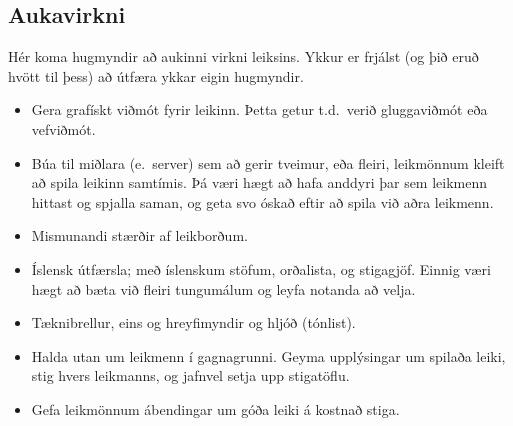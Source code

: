\documentclass[12pt,a4paper]{article}
\begin{document}
\subsection*{Aukavirkni}

Hér koma hugmyndir að aukinni virkni leiksins. Ykkur er frjálst (og þið eruð hvött til þess) að útfæra ykkar eigin hugmyndir.

\begin{itemize}

	\item Gera grafískt viðmót fyrir leikinn. Þetta getur t.d.~verið gluggaviðmót eða vefviðmót.

	\item Búa til miðlara (e.~server) sem að gerir tveimur, eða fleiri, leikmönnum kleift að spila leikinn samtímis.  Þá væri hægt að hafa anddyri þar sem leikmenn hittast og spjalla saman, og geta svo óskað eftir að spila við aðra leikmenn.

	\item Mismunandi stærðir af leikborðum.

	\item Íslensk útfærsla; með íslenskum stöfum, orðalista, og stigagjöf. Einnig væri hægt að bæta við fleiri tungumálum og leyfa notanda að velja.

	\item Tæknibrellur, eins og hreyfimyndir og hljóð (tónlist).

	\item Halda utan um leikmenn í gagnagrunni. Geyma upplýsingar um spilaða leiki, stig hvers leikmanns, og jafnvel setja upp stigatöflu.

	\item Gefa leikmönnum ábendingar um góða leiki á kostnað stiga.

\end{itemize}
\end{document}
